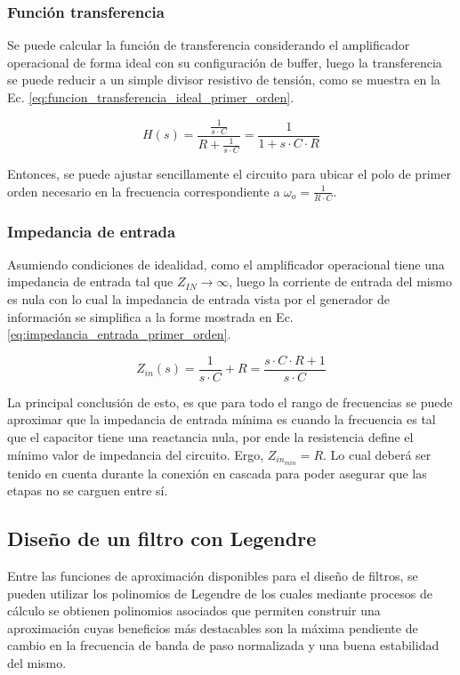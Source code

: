\subsubsection{Funci\'on transferencia}
Se puede calcular la funci\'on de transferencia considerando el amplificador operacional de forma ideal con su configuraci\'on de buffer,
luego la transferencia se puede reducir a un simple divisor resistivo de tensi\'on, como se muestra en la Ec. \ref{eq:funcion_transferencia_ideal_primer_orden}.

\begin{equation}
    H(s) = \frac{\frac{1}{s \cdot C}}{R + \frac{1}{s \cdot C}} = \frac{1}{1 + s \cdot C \cdot R}
    \label{eq:funcion_transferencia_ideal_primer_orden}
\end{equation}

Entonces, se puede ajustar sencillamente el circuito para ubicar el polo de primer orden necesario en la frecuencia correspondiente a $\omega_o = \frac{1}{R \cdot C}$.

\subsubsection{Impedancia de entrada}
Asumiendo condiciones de idealidad, como el amplificador operacional tiene una impedancia de entrada tal que $Z_{IN} \rightarrow \infty$, luego la corriente de entrada del mismo es nula
con lo cual la impedancia de entrada vista por el generador de informaci\'on se simplifica a la forme mostrada en Ec. \ref{eq:impedancia_entrada_primer_orden}.

\begin{equation}
    Z_{in}(s) = \frac{1}{s \cdot C} + R = \frac{s \cdot C \cdot R + 1}{s \cdot C}
    \label{eq:impedancia_entrada_primer_orden}
\end{equation}

La principal conclusi\'on de esto, es que para todo el rango de frecuencias se puede aproximar que la impedancia de entrada m\'inima es cuando la frecuencia es tal que el capacitor
tiene una reactancia nula, por ende la resistencia define el m\'inimo valor de impedancia del circuito. Ergo, $Z_{in_{min}} = R$. Lo cual deber\'a ser tenido en cuenta durante la conexi\'on
en cascada para poder asegurar que las etapas no se carguen entre s\'i.

\subsection{Dise\~no de un filtro con Legendre}
Entre las funciones de aproximaci\'on disponibles para el dise\~no de filtros, se pueden utilizar los polinomios de Legendre de los cuales
mediante procesos de c\'alculo se obtienen polinomios asociados que permiten construir una aproximaci\'on cuyas beneficios m\'as destacables son la m\'axima pendiente
de cambio en la frecuencia de banda de paso normalizada y una buena estabilidad del mismo.


